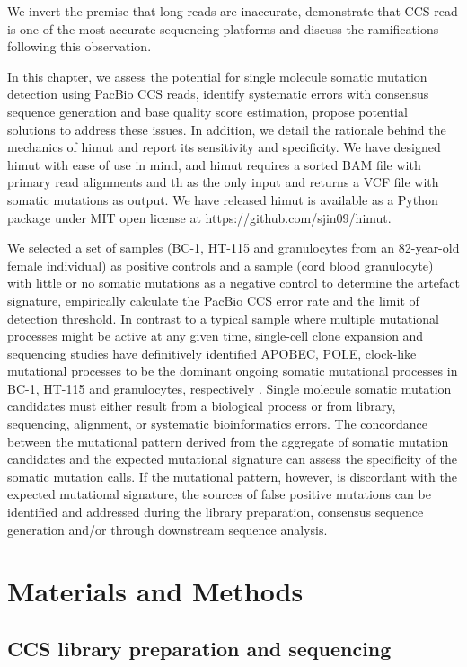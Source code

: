 We invert the premise that long reads are inaccurate, demonstrate that CCS read is one of the most accurate sequencing platforms and discuss the ramifications following this observation.

In this chapter, we assess the potential for single molecule somatic mutation detection using PacBio CCS reads, identify systematic errors with consensus sequence generation and base quality score estimation, propose potential solutions to address these issues. In addition, we detail the rationale behind the mechanics of himut and report its sensitivity and specificity. We have designed himut with ease of use in mind, and himut requires a sorted BAM file with primary read alignments and th as the only input and returns a VCF file with somatic mutations as output. We have released himut is available as a Python package under MIT open license at https://github.com/sjin09/himut.

We selected a set of samples (BC-1, HT-115 and granulocytes from an 82-year-old female individual) as positive controls and a sample (cord blood granulocyte) with little or no somatic mutations as a negative control to determine the artefact signature, empirically calculate the PacBio CCS error rate and the limit of detection threshold. In contrast to a typical sample where multiple mutational processes might be active at any given time, single-cell clone expansion and sequencing studies have definitively identified APOBEC, POLE, clock-like mutational processes to be the dominant ongoing somatic mutational processes in BC-1, HT-115 and granulocytes, respectively \cite{Petljak2019-wi, Mitchell2022-ry}. Single molecule somatic mutation candidates must either result from a biological process or from library, sequencing, alignment, or systematic bioinformatics errors. The concordance between the mutational pattern derived from the aggregate of somatic mutation candidates and the expected mutational signature can assess the specificity of the somatic mutation calls. If the mutational pattern, however, is discordant with the expected mutational signature, the sources of false positive mutations can be identified and addressed during the library preparation, consensus sequence generation and/or through downstream sequence analysis.


\section{Materials and Methods}

\subsection{CCS library preparation and sequencing}

